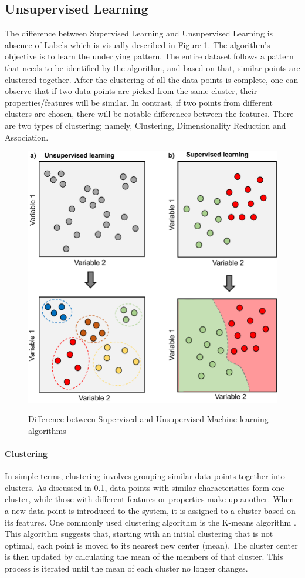 \documentclass[en,]{template/rrlab}
\begin{document}
\subsection{Unsupervised Learning}\label{unsupervised-learning}
The difference between Supervised Learning and Unsupervised Learning is absence of Labels which is visually described in Figure \ref{fig:chapter-2_sup_vs_unsup}. The algorithm's objective is to learn the underlying pattern. The entire dataset follows a pattern that needs to be identified by the algorithm, and based on that, similar points are clustered together. After the clustering of all the data points is complete, one can observe that if two data points are picked from the same cluster, their properties/features will be similar. In contrast, if two points from different clusters are chosen, there will be notable differences between the features. There are two types of clustering; namely, Clustering, Dimensionality Reduction and Association.

\begin{figure}[ht]
    \centering
    \includegraphics[height=0.5\textwidth]{figures/Supervised-and-unsupervised-machine-learning-a-Schematic-representation-of-an.png}
    \caption{Difference between Supervised and Unsupervised Machine learning algorithms}
    \cite{sup_vs_unsup}
    \label{fig:chapter-2_sup_vs_unsup}
\end{figure}

\paragraph{Clustering}
In simple terms, clustering involves grouping similar data points together into clusters. As discussed in \ref{unsupervised-learning}, data points with similar characteristics form one cluster, while those with different features or properties make up another. When a new data point is introduced to the system, it is assigned to a cluster based on its features. One commonly used clustering algorithm is the K-means algorithm \cite{Jin2010}. This algorithm suggests that, starting with an initial clustering that is not optimal, each point is moved to its nearest new center (mean). The cluster center is then updated by calculating the mean of the members of that cluster. This process is iterated until the mean of each cluster no longer changes. 
\end{document}
